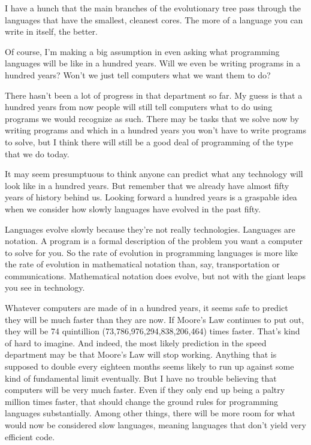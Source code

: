 I have a hunch that the main branches of the evolutionary tree pass
through the languages that have the smallest, cleanest cores. The more
of a language you can write in itself, the better.

Of course, I'm making a big assumption in even asking what programming
languages will be like in a hundred years. Will we even be writing
programs in a hundred years? Won't we just tell computers what we want
them to do?

There hasn't been a lot of progress in that department so far. My guess
is that a hundred years from now people will still tell computers what
to do using programs we would recognize as such. There may be tasks that
we solve now by writing programs and which in a hundred years you won't
have to write programs to solve, but I think there will still be a good
deal of programming of the type that we do today.

It may seem presumptuous to think anyone can predict what any technology
will look like in a hundred years. But remember that we already have
almost fifty years of history behind us. Looking forward a hundred years
is a graspable idea when we consider how slowly languages have evolved
in the past fifty.

Languages evolve slowly because they're not really technologies.
Languages are notation. A program is a formal description of the problem
you want a computer to solve for you. So the rate of evolution in
programming languages is more like the rate of evolution in mathematical
notation than, say, transportation or communications. Mathematical
notation does evolve, but not with the giant leaps you see in
technology.

Whatever computers are made of in a hundred years, it seems safe to
predict they will be much faster than they are now. If Moore's Law
continues to put out, they will be 74 quintillion
(73,786,976,294,838,206,464) times faster. That's kind of hard to
imagine. And indeed, the most likely prediction in the speed department
may be that Moore's Law will stop working. Anything that is supposed to
double every eighteen months seems likely to run up against some kind of
fundamental limit eventually. But I have no trouble believing that
computers will be very much faster. Even if they only end up being a
paltry million times faster, that should change the ground rules for
programming languages substantially. Among other things, there will be
more room for what would now be considered slow languages, meaning
languages that don't yield very efficient code.

